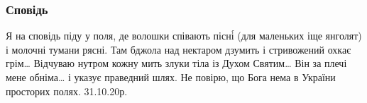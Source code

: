  
 
 

\subsubsection{Сповідь}
\label{sec:poetry.rus.mykola_sobol.spovid}

Я на сповідь піду у поля,
де волошки співають пісні́
(для маленьких іще янголят)
і молочні тумани рясні.
Там бджола над нектаром дзумить
і стривожений охкає грім…
Відчуваю нутром кожну мить
злуки тіла із Духом Святим…
Він за плечі мене обніма…
і указує праведний шлях.
Не повірю, що Бога нема
в України просторих полях.
31.10.20р.
